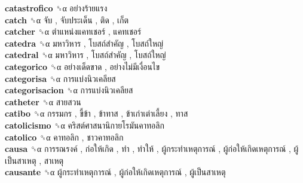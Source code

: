 \textbf{catastrofico} ␝α   อย่างร้ายแรง   \\
\textbf{catch} ␝α   จับ ,  จับประเด็น ,  ติด ,  เก็ต   \\
\textbf{catcher} ␝α   ตำแหน่งแคทเชอร์ ,  แคทเชอร์   \\
\textbf{catedra} ␝α   มหาวิหาร ,  โบสถ์สำคัญ ,  โบสถ์ใหญ่   \\
\textbf{catedral} ␝α   มหาวิหาร ,  โบสถ์สำคัญ ,  โบสถ์ใหญ่   \\
\textbf{categorico} ␝α   อย่างเด็ดขาด ,  อย่างไม่มีเงื่อนไข   \\
\textbf{categorisa} ␝α   การแบ่งนิวเคลียส   \\
\textbf{categorisacion} ␝α   การแบ่งนิวเคลียส   \\
\textbf{catheter} ␝α   สายสวน   \\
\textbf{catibo} ␝α   กรรมกร ,  ขี้ข้า ,  ข้าทาส ,  ข้าเก่าเต่าเลี้ยง ,  ทาส   \\
\textbf{catolicismo} ␝α   คริสต์ศาสนานิกายโรมันคาทอลิก   \\
\textbf{catolico} ␝α   คาทอลิก ,  ชาวคาทอลิก   \\
\textbf{causa} ␝α   การรณรงค์ ,  ก่อให้เกิด ,  ทำ ,  ทำให้ ,  ผู้กระทำเหตุการณ์ ,  ผู้ก่อให้เกิดเหตุการณ์ ,  ผู้เป็นสาเหตุ ,  สาเหตุ   \\
\textbf{causante} ␝α   ผู้กระทำเหตุการณ์ ,  ผู้ก่อให้เกิดเหตุการณ์ ,  ผู้เป็นสาเหตุ   \\

